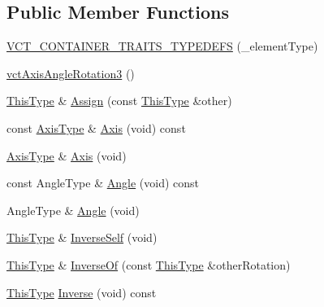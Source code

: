 \subsection*{Public Member Functions}
\begin{DoxyCompactItemize}
\item 
\hyperlink{classvct_axis_angle_rotation3_a6961961f60bc9f9ad6c2c1978f53238b}{V\+C\+T\+\_\+\+C\+O\+N\+T\+A\+I\+N\+E\+R\+\_\+\+T\+R\+A\+I\+T\+S\+\_\+\+T\+Y\+P\+E\+D\+E\+F\+S} (\+\_\+element\+Type)
\item 
\hyperlink{classvct_axis_angle_rotation3_a204b668773ce3653801fe19a776a95d5}{vct\+Axis\+Angle\+Rotation3} ()
\item 
\hyperlink{classvct_axis_angle_rotation3_af654a8037b7b82a378f69cb1bfd9b8dd}{This\+Type} \& \hyperlink{classvct_axis_angle_rotation3_adc6555da59fc027daac377767fbbb6c6}{Assign} (const \hyperlink{classvct_axis_angle_rotation3_af654a8037b7b82a378f69cb1bfd9b8dd}{This\+Type} \&other)
\item 
const \hyperlink{classvct_axis_angle_rotation3_a3178fd901bb60bb447711b9d5f7e7aae}{Axis\+Type} \& \hyperlink{classvct_axis_angle_rotation3_aa20fe6d1c17276a020efcc739dba37a0}{Axis} (void) const 
\item 
\hyperlink{classvct_axis_angle_rotation3_a3178fd901bb60bb447711b9d5f7e7aae}{Axis\+Type} \& \hyperlink{classvct_axis_angle_rotation3_a79e1af8f556aac9e63a26687a50b6745}{Axis} (void)
\item 
const Angle\+Type \& \hyperlink{classvct_axis_angle_rotation3_a49fa5666cf32e7883f8478c5ce135a75}{Angle} (void) const 
\item 
Angle\+Type \& \hyperlink{classvct_axis_angle_rotation3_a583ad12369e06b7788fd473a812663f1}{Angle} (void)
\item 
\hyperlink{classvct_axis_angle_rotation3_af654a8037b7b82a378f69cb1bfd9b8dd}{This\+Type} \& \hyperlink{classvct_axis_angle_rotation3_a088952ce769f71e7f13a38e2654714b3}{Inverse\+Self} (void)
\item 
\hyperlink{classvct_axis_angle_rotation3_af654a8037b7b82a378f69cb1bfd9b8dd}{This\+Type} \& \hyperlink{classvct_axis_angle_rotation3_a8172f2362d94c1c0a802568b99ae4fda}{Inverse\+Of} (const \hyperlink{classvct_axis_angle_rotation3_af654a8037b7b82a378f69cb1bfd9b8dd}{This\+Type} \&other\+Rotation)
\item 
\hyperlink{classvct_axis_angle_rotation3_af654a8037b7b82a378f69cb1bfd9b8dd}{This\+Type} \hyperlink{classvct_axis_angle_rotation3_a9f9e7f38289d1b9e77f3f3cc3c1d5213}{Inverse} (void) const 
\item 

\end{DoxyCompactItemize}
